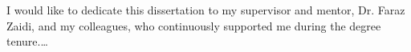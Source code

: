 
\begin{dedication} 

I would like to dedicate this dissertation to my supervisor and mentor, Dr. Faraz Zaidi, and my colleagues, who continuously supported me during the degree tenure.\dots

\end{dedication}